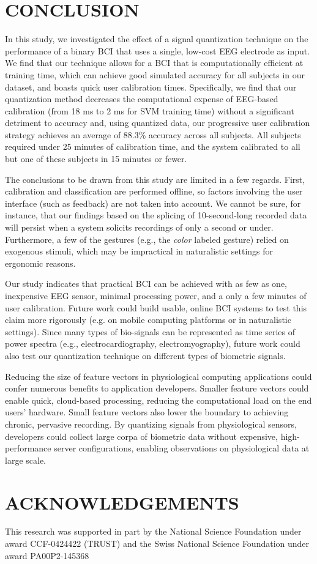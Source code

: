 \section{\uppercase{Conclusion}}
\label{sec:conclusion}

\noindent In this study, we investigated the effect of a signal quantization technique on the performance of a binary BCI that uses a single, low-cost EEG electrode as input. We find that our technique allows for a BCI that is computationally efficient at training time, which can achieve good simulated accuracy for all subjects in our dataset, and boasts quick user calibration times. Specifically, we find that our quantization method decreases the computational expense of EEG-based calibration (from 18 ms to 2 ms for SVM training time) without a significant detriment to accuracy and, using quantized data, our progressive user calibration strategy achieves an average of 88.3\% accuracy across all subjects. All subjects required under 25 minutes of calibration time, and the system calibrated to all but one of these subjects in 15 minutes or fewer.

The conclusions to be drawn from this study are limited in a few regards. First, calibration and classification are performed offline, so factors involving the user interface (such as feedback) are not taken into account. We cannot be sure, for instance, that our findings based on the splicing of 10-second-long recorded data will persist when a system solicits recordings of only a second or under. Furthermore, a few of the gestures (e.g., the {\it color} labeled gesture) relied on exogenous stimuli, which may be impractical in naturalistic settings for ergonomic reasons. 

Our study indicates that practical BCI can be achieved with as few as one, inexpensive EEG sensor, minimal processing power, and a only a few minutes of user calibration. Future work could build usable, online BCI systems to test this claim more rigorously (e.g. on mobile computing platforms or in naturalistic settings). Since many types of bio-signals can be represented as time series of power spectra (e.g., electrocardiography, electromyography), future work could also test our quantization technique on different types of biometric signals.

Reducing the size of feature vectors in physiological computing applications could confer numerous benefits to application developers. Smaller feature vectors could enable quick, cloud-based processing, reducing the computational load on the end users' hardware. Small feature vectors also lower the boundary to achieving chronic, pervasive recording. By quantizing signals from physiological sensors, developers could collect large corpa of biometric data without expensive, high-performance server configurations, enabling observations on physiological data at large scale.


\section*{\uppercase{Acknowledgements}}
This research was supported in part by the National Science Foundation under award CCF-0424422 (TRUST) and the Swiss National Science Foundation under award PA00P2-145368

